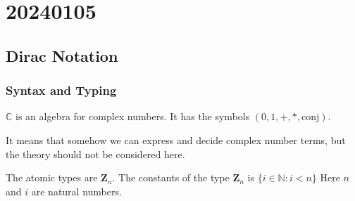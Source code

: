 \chapter{20240105}


\section{Dirac Notation}


\subsection{Syntax and Typing}

\begin{postulate}
  $\mathbb{C}$ is an algebra for complex numbers. It has the symbols $(0, 1, +, *, \textrm{conj})$.
\end{postulate}
It means that somehow we can express and decide complex number terms, but the theory should not be considered here.

\begin{definition}
  The atomic types are $\mathbf{Z}_n$.
  The constants of the type $\mathbf{Z}_n$ is $\{i \in \mathbb{N} : i<n\}$
  Here $n$ and $i$ are natural numbers.
\end{definition}


\newcommand*{\unit}{\texttt{unit}}
\newcommand*{\utt}{\texttt{tt}}
\newcommand*{\fst}{\texttt{fst}}
\newcommand*{\snd}{\texttt{snd}}
\newcommand*{\reduce}{\ \triangleright\ }

